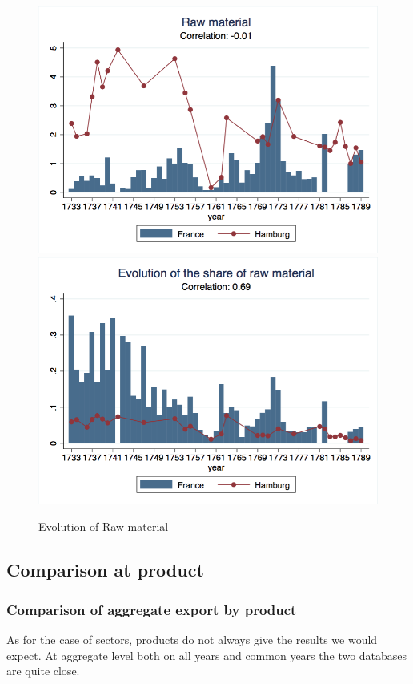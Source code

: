 \documentclass[12pt,a4paper,titlepage,english]{article}
\begin{document}
\begin{figure}
\caption{Evolution of Raw material}
\includegraphics[scale=.28]{raw_mat_long.png}
\includegraphics[scale=.28]{rawmat_share.png}
\end{figure}

\subsection{Comparison at product}
\subsubsection{Comparison of aggregate export by product}

As for the case of sectors, products do not always give the results we would expect. At aggregate level both on all years and common years the two databases are quite close. 
\end{document}
